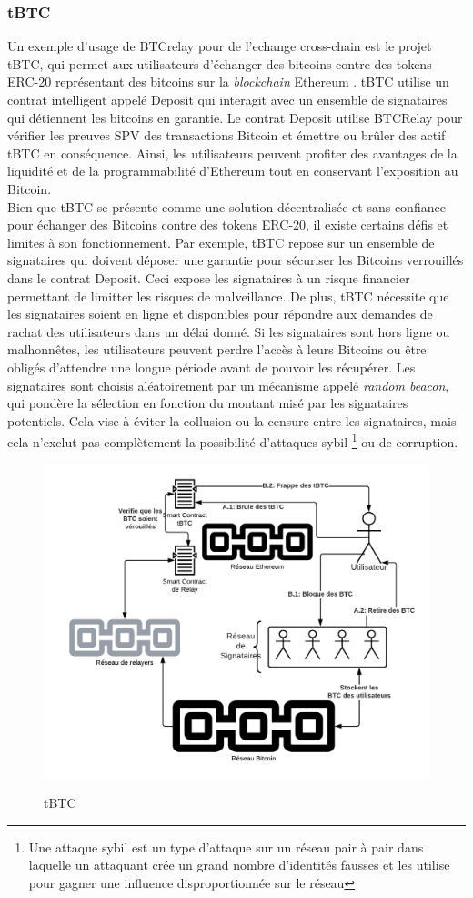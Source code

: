 \subsubsection{tBTC}
Un exemple d'usage de BTCrelay pour de l'echange \gls{cross-chain} est le projet tBTC, qui permet aux utilisateurs d’échanger des bitcoins contre des 
tokens ERC-20 représentant des bitcoins sur la \textit{\gls{blockchain}} Ethereum \cite{hildebrandt2020tokenization,lan2021horizon}. tBTC utilise un contrat intelligent 
appelé Deposit qui interagit avec un ensemble de signataires qui détiennent les bitcoins en garantie. 
Le contrat Deposit utilise BTCRelay pour vérifier les preuves SPV des transactions \gls{Bitcoin} et émettre ou 
brûler des \gls{actif} tBTC en conséquence. Ainsi, les utilisateurs peuvent profiter des avantages de la liquidité 
et de la programmabilité d’\gls{Ethereum} tout en conservant l’exposition au \gls{Bitcoin}. \\
Bien que tBTC se présente comme une solution décentralisée et sans confiance pour échanger des \gls{Bitcoin}s contre 
des tokens ERC-20, il existe certains défis et limites à son fonctionnement. 
Par exemple, tBTC repose sur un ensemble de signataires qui doivent déposer une garantie pour sécuriser les \gls{Bitcoin}s
verrouillés dans le contrat Deposit. Ceci expose les signataires à un risque financier permettant de limitter les risques de malveillance. 
De plus, tBTC nécessite que les signataires soient en ligne et disponibles pour répondre aux demandes de rachat des 
utilisateurs dans un délai donné. Si les signataires sont hors ligne ou malhonnêtes, les utilisateurs peuvent 
perdre l’accès à leurs \gls{Bitcoin}s ou être obligés d’attendre une longue période avant de pouvoir les récupérer. 
Les signataires sont choisis aléatoirement par un mécanisme appelé \textit{random beacon}, qui pondère la sélection en 
fonction du montant misé par les signataires potentiels. Cela vise à éviter la collusion ou la censure entre les 
signataires, mais cela n’exclut pas complètement la possibilité d’attaques sybil \footnote{Une attaque sybil est 
un type d’attaque sur un réseau pair à pair dans laquelle un attaquant crée un grand nombre d’identités fausses 
et les utilise pour gagner une influence disproportionnée sur le réseau} ou de corruption.

\begin{figure}[h!]
  \centering
  \includegraphics[scale=0.5]{decentralisation/tBTC.png}
  \label{fig:tBTC}
  \caption{tBTC}
\end{figure}

